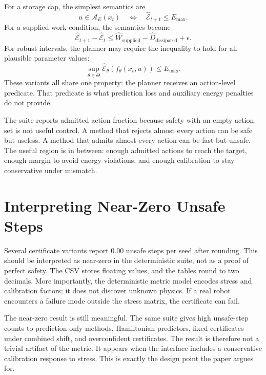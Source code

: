 \documentclass{article}
\newcommand{\state}{x}
\newcommand{\action}{u}
\newcommand{\storage}{\mathcal{E}}
\newcommand{\admiss}{\mathcal{A}}
\begin{document}
For a storage cap, the simplest semantics are
\begin{equation}
    \action \in \admiss_E(\state_t)
    \quad \Leftrightarrow \quad
    \hat{\storage}_{t+1}\leq E_{\max}.
\end{equation}
For a supplied-work condition, the semantics become
\begin{equation}
    \hat{\storage}_{t+1}-\hat{\storage}_{t}
    \leq
    \hat{W}_{\mathrm{supplied}}-\hat{D}_{\mathrm{dissipated}}+\epsilon.
\end{equation}
For robust intervals, the planner may require the inequality to hold for all plausible parameter values:
\begin{equation}
    \sup_{\theta\in\Theta}
    \hat{\storage}_{\theta}(f_\theta(\state_t,\action))
    \leq
    E_{\max}.
\end{equation}
These variants all share one property: the planner receives an action-level predicate. That predicate is what prediction loss and auxiliary energy penalties do not provide.

The suite reports admitted action fraction because safety with an empty action set is not useful control. A method that rejects almost every action can be safe but useless. A method that admits almost every action can be fast but unsafe. The useful region is in between: enough admitted actions to reach the target, enough margin to avoid energy violations, and enough calibration to stay conservative under mismatch.

\section{Interpreting Near-Zero Unsafe Steps}

Several certificate variants report 0.00 unsafe steps per seed after rounding. This should be interpreted as near-zero in the deterministic suite, not as a proof of perfect safety. The CSV stores floating values, and the tables round to two decimals. More importantly, the deterministic metric model encodes stress and calibration factors; it does not discover unknown physics. If a real robot encounters a failure mode outside the stress matrix, the certificate can fail.

The near-zero result is still meaningful. The same suite gives high unsafe-step counts to prediction-only methods, Hamiltonian predictors, fixed certificates under combined shift, and overconfident certificates. The result is therefore not a trivial artifact of the metric. It appears when the interface includes a conservative calibration response to stress. This is exactly the design point the paper argues for.
\end{document}
